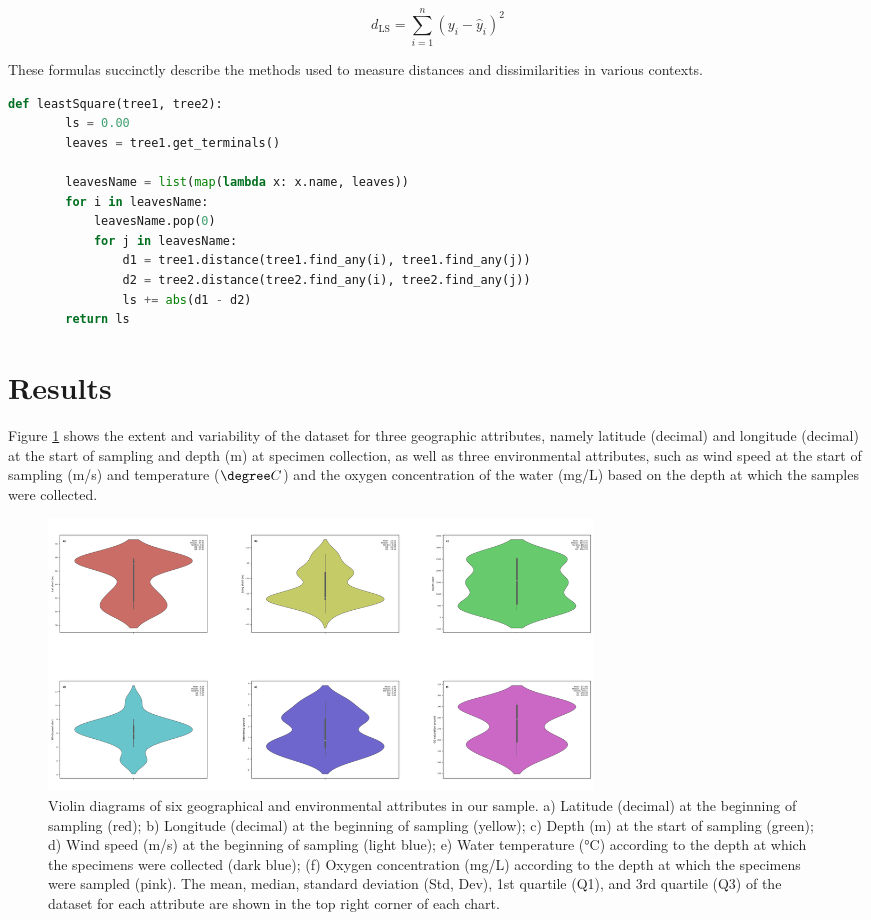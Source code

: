 \[ d_{\text{LS}} = \sum_{i=1}^{n} (y_i - \hat{y}_i)^2 \]

These formulas succinctly describe the methods used to measure distances and dissimilarities in various contexts.

\begin{lstlisting}[label=lst:LeastSquare,language=Python,caption=Python script for calculating the Least-Square distance using the ete3 package in aPhyloGeo package]
    def leastSquare(tree1, tree2):
        ls = 0.00
        leaves = tree1.get_terminals()

        leavesName = list(map(lambda x: x.name, leaves))
        for i in leavesName:
            leavesName.pop(0)
            for j in leavesName:
                d1 = tree1.distance(tree1.find_any(i), tree1.find_any(j))
                d2 = tree2.distance(tree2.find_any(i), tree2.find_any(j))
                ls += abs(d1 - d2)
        return ls
\end{lstlisting}

\section{Results}\label{results}

Figure \ref{fig:fig1} shows the extent and variability of the dataset for three geographic attributes, namely latitude (decimal) and longitude (decimal) at the start of sampling and depth (m) at specimen collection, as well as three environmental attributes, such as wind speed at the start of sampling (m/s) and temperature (\( \degree C \)) and the oxygen concentration of the water (mg/L) based on the depth at which the samples were collected.

\begin{figure}[]
    \centering
    \includegraphics[width=0.7\textwidth]{figure1.jpg}
    \caption{Violin diagrams of six geographical and environmental attributes in our sample. a) Latitude (decimal) at the beginning of sampling (red); b) Longitude (decimal) at the beginning of sampling (yellow); c) Depth (m) at the start of sampling (green); d) Wind speed (m/s) at the beginning of sampling (light blue); e) Water temperature (°C) according to the depth at which the specimens were collected (dark blue); (f) Oxygen concentration (mg/L) according to the depth at which the specimens were sampled (pink). The mean, median, standard deviation (Std, Dev), 1st quartile (Q1), and 3rd quartile (Q3) of the dataset for each attribute are shown in the top right corner of each chart. \label{fig:fig1}}
\end{figure}

